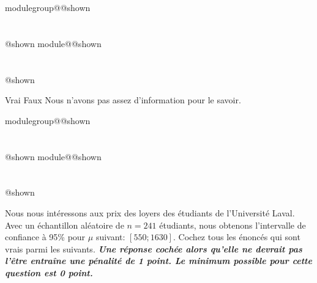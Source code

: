 \documentclass{Evaluation}
\makeatletter
\newcommand{\currentmodulekey}{}
\newcommand{\currentmoduletitle}{}
\newcommand{\currentgroupkey}{}
\newcommand{\currentgrouptitle}{}
\newcommand{\showmoduleifneeded}{%
  \ifx\currentgroupkey\empty\else
    \expandafter\ifx\csname modulegroup@\currentgroupkey @shown\endcsname\relax
      \section*{\currentgrouptitle}%
      \expandafter\gdef\csname modulegroup@\currentgroupkey @shown\endcsname{1}%
    \fi
  \fi
  \expandafter\ifx\csname module@\currentmodulekey @shown\endcsname\relax
    \section*{\currentmoduletitle}%
    \expandafter\gdef\csname module@\currentmodulekey @shown\endcsname{1}%
  \fi
}
\newenvironment{H24}{\showmoduleifneeded}{}
\newenvironment{A25}{\showmoduleifneeded}{}
\makeatother
\begin{document}
\begin{questions}
\begin{A25}
\begin{parts}
\medskip   \begin{oneparcheckboxes}
        \choice Vrai
        \CorrectChoice Faux
        \choice Nous n'avons pas assez d'information pour le savoir.
\medskip    \end{oneparcheckboxes}


\end{parts}
\medskip
\end{A25}

\begin{H24}
\question {} %
Nous nous intéressons aux prix des loyers des étudiants de l'Université Laval.
Avec un échantillon aléatoire de $n=241$ étudiants, nous obtenons l'intervalle de confiance à 95\%  pour $\mu$ suivant: $[550;1630]$.
Cochez tous les énoncés qui sont vrais parmi les suivants. \textit{\textbf{Une réponse cochée alors qu'elle ne devrait pas l'être entraîne une pénalité de 1 point. Le minimum possible pour cette question est 0 point.}}


\end{H24}
\end{questions}
\end{document}
